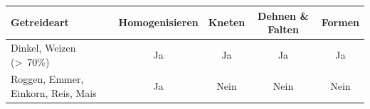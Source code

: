 \begin{tabular}{@{}lcccc@{}}
\toprule
\textbf{Getreideart}        & \textbf{Homogenisieren} & \textbf{Kneten} & \textbf{Dehnen \& Falten} & \textbf{Formen} \\ \midrule
Dinkel, Weizen (\textgreater{}~70\%) & Ja & Ja & Ja & Ja \\
Roggen, Emmer, Einkorn, Reis, Mais    & Ja & Nein  & Nein  & Nein  \\ \bottomrule
\end{tabular}
